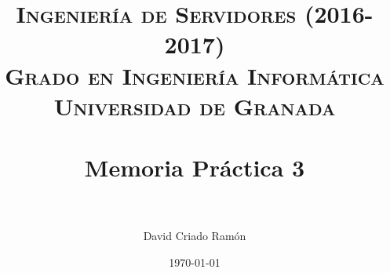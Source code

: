 



\title{	
\normalfont \normalsize 
\textsc{\textbf{Ingeniería de Servidores (2016-2017)} \\ Grado en Ingeniería Informática \\ Universidad de Granada} \\ [25pt] %
\horrule{0.5pt} \\[0.4cm] %
\huge Memoria Práctica 3 \\ %
\horrule{2pt} \\[0.5cm] %
}

\author{David Criado Ramón} %

\date{\normalsize\today} %








\maketitle %

\newpage %

\tableofcontents %

\listoffigures

\listoftables

\newpage
